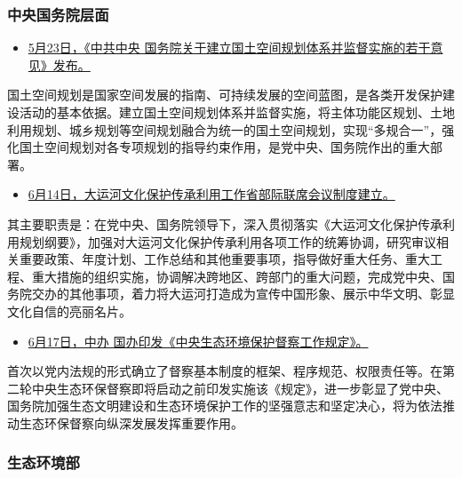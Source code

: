 \documentclass[
]{book}
\providecommand{\tightlist}{%
  \setlength{\itemsep}{0pt}\setlength{\parskip}{0pt}}
\begin{document}
\hypertarget{ux4e2dux592eux56fdux52a1ux9662ux5c42ux9762-3}{%
\subsubsection*{中央国务院层面}\label{ux4e2dux592eux56fdux52a1ux9662ux5c42ux9762-3}}

\begin{itemize}
\tightlist
\item
  \href{http://www.gov.cn/xinwen/2019-05/23/content_5394187.htm}{5月23日，《中共中央 国务院关于建立国土空间规划体系并监督实施的若干意见》发布。}
\end{itemize}

国土空间规划是国家空间发展的指南、可持续发展的空间蓝图，是各类开发保护建设活动的基本依据。建立国土空间规划体系并监督实施，将主体功能区规划、土地利用规划、城乡规划等空间规划融合为统一的国土空间规划，实现``多规合一''，强化国土空间规划对各专项规划的指导约束作用，是党中央、国务院作出的重大部署。

\begin{itemize}
\tightlist
\item
  \href{https://mp.weixin.qq.com/s/fzrm-jPCCsxRzPWU5TMA6A}{6月14日，大运河文化保护传承利用工作省部际联席会议制度建立。}
\end{itemize}

其主要职责是：在党中央、国务院领导下，深入贯彻落实《大运河文化保护传承利用规划纲要》，加强对大运河文化保护传承利用各项工作的统筹协调，研究审议相关重要政策、年度计划、工作总结和其他重要事项，指导做好重大任务、重大工程、重大措施的组织实施，协调解决跨地区、跨部门的重大问题，完成党中央、国务院交办的其他事项，着力将大运河打造成为宣传中国形象、展示中华文明、彰显文化自信的亮丽名片。

\begin{itemize}
\tightlist
\item
  \href{http://www.gov.cn/xinwen/2019-06/17/content_5401085.htm}{6月17日，中办 国办印发《中央生态环境保护督察工作规定》。}
\end{itemize}

首次以党内法规的形式确立了督察基本制度的框架、程序规范、权限责任等。在第二轮中央生态环保督察即将启动之前印发实施该《规定》，进一步彰显了党中央、国务院加强生态文明建设和生态环境保护工作的坚强意志和坚定决心，将为依法推动生态环保督察向纵深发展发挥重要作用。

\hypertarget{ux751fux6001ux73afux5883ux90e8-4}{%
\subsubsection*{生态环境部}\label{ux751fux6001ux73afux5883ux90e8-4}}
\end{document}
